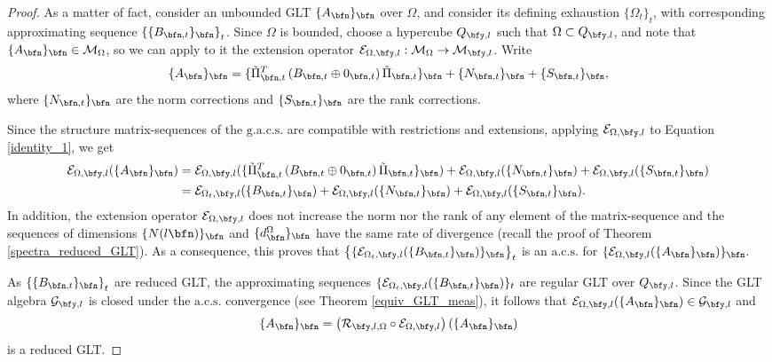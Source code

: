 \documentclass{amsart}
\begin{document}
\begin{proof}
    As a matter of fact, consider an unbounded GLT $\{A_\bfn\}_\bfn$ over $\Omega$, and consider its defining exhaustion $\{\Omega_t\}_t$, with corresponding approximating sequence $\left\{\{B_{\bfn,t}\}_\bfn\right\}_t$. Since $\Omega$ is bounded, choose a hypercube $Q_{\bfy,l}$ such that $\Omega\subset Q_{\bfy,l}$, and note that $\{A_\bfn\}_\bfn\in\mathcal{M}_{\Omega}$, so we can apply to it the extension operator $\mathcal{E}_{\Omega,\bfy,l}:\mathcal{M}_\Omega\to\mathcal{M}_{\bfy,l}$.
    Write 
    \begin{equation}\label{identity_1}
        \{A_\bfn\}_\bfn=\{\tilde{\Pi}_{\bfn,t}^{T}\left(B_{\bfn,t}\oplus0_{\bfn,t}\right)\tilde{\Pi}_{\bfn,t}\}_\bfn+\{N_{\bfn,t}\}_\bfn+\{S_{\bfn,t}\}_\bfn,
    \end{equation}
    where $\{N_{\bfn,t}\}_\bfn$ are the norm corrections and $\{S_{\bfn,t}\}_\bfn$ are the rank corrections.
    
    Since the structure matrix-sequences of the $\mathrm{g.a.c.s.}$ are compatible with restrictions and extensions, applying $\mathcal{E}_{\Omega,\bfy,l}$ to Equation \eqref{identity_1}, we get
    \begin{align*}
        \mathcal{E}_{\Omega,\bfy,l}(\{A_\bfn\}_\bfn)&= \mathcal{E}_{\Omega,\bfy,l}(\{\tilde{\Pi}_{\bfn,t}^{T}\left(B_{\bfn,t}\oplus0_{\bfn,t}\right)\tilde{\Pi}_{\bfn,t}\}_\bfn)+\mathcal{E}_{\Omega,\bfy,l}(\{N_{\bfn,t}\}_\bfn)+\mathcal{E}_{\Omega,\bfy,l}(\{S_{\bfn,t}\}_\bfn)\\
        &=\mathcal{E}_{\Omega_t,\bfy,l}(\{B_{\bfn,t}\}_\bfn)+\mathcal{E}_{\Omega,\bfy,l}(\{N_{\bfn,t}\}_\bfn)+\mathcal{E}_{\Omega,\bfy,l}(\{S_{\bfn,t}\}_\bfn).
    \end{align*}
    In addition, the extension operator $\mathcal{E}_{\Omega,\bfy,l}$ does not increase the norm nor the rank of any element of the matrix-sequence and the sequences of dimensions $\{N(l\bfn)\}_\bfn$ and $\{d_\bfn^\Omega\}_\bfn$ have the same rate of divergence (recall the proof of Theorem \ref{spectra_reduced_GLT}). As a consequence, this proves that $\left\{\{\mathcal{E}_{\Omega_t,\bfy,l}(\{B_{\bfn,t}\}_\bfn)\}_\bfn\right\}_t$ is an $\mathrm{a.c.s.}$ for $\{\mathcal{E}_{\Omega,\bfy,l}(\{A_\bfn\}_\bfn)\}_\bfn$. 

    
    As $\left\{\{B_{\bfn,t}\}_\bfn\right\}_t$ are reduced GLT, the approximating sequences $\{\mathcal{E}_{\Omega_t,\bfy,l}(\{B_{\bfn,t}\}_\bfn)\}_t$ are regular GLT over $Q_{\bfy,l}$. Since the GLT algebra $\mathcal{G}_{\bfy,l}$ is closed under the $\mathrm{a.c.s.}$ convergence (see Theorem \ref{equiv_GLT_meas}), it follows that $\mathcal{E}_{\Omega,\bfy,l}(\{A_\bfn\}_\bfn)\in\mathcal{G}_{\bfy,l}$ and 
    \begin{equation*}
        \{A_\bfn\}_\bfn=\left(\mathcal{R}_{\bfy,l,\Omega}\circ\mathcal{E}_{\Omega,\bfy,l}\right)(\{A_\bfn\}_\bfn)
    \end{equation*}
    is a reduced GLT.
\end{proof}
\end{document}
